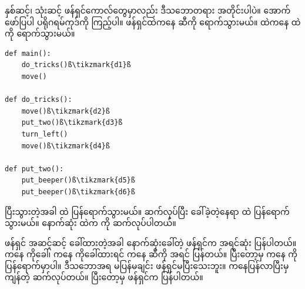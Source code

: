 နှစ်ဆင့်၊ သုံးဆင့် ဖန်ရှင်ကောလ်တွေမှာလည်း ဒီသဘောတရား အတိုင်းပါပဲ။ အောက်ဖော်ပြပါ ပရိုဂရမ်ကုဒ်ကို ကြည့်ပါ။  ဖန်ရှင်ထဲကနေ  ဆီကို ရောက်သွားမယ်။  ထဲကနေ  ထဲကို ရောက်သွားမယ်။ 
%
\setlength{\fboxsep}{0pt}
\begin{verbatim}
def main():
    do_tricks()ß\tikzmark{d1}ß
    move()

def do_tricks():
    move()ß\tikzmark{d2}ß
    put_two()ß\tikzmark{d3}ß
    turn_left()
    move()ß\tikzmark{d4}ß

def put_two():
    put_beeper()ß\tikzmark{d5}ß
    put_beeper()ß\tikzmark{d6}ß
\end{verbatim}
%
%

 ပြီးသွားတဲ့အခါ  ထဲ ပြန်ရောက်သွားမယ်။ \fEn{,}  ဆက်လုပ်ပြီး  ခေါ်ခဲ့တဲ့နေရာ  ထဲ ပြန်ရောက်သွားမယ်။ နောက်ဆုံး  ထဲက   ကို ဆက်လုပ်ပါတယ်။

ဖန်ရှင် အဆင့်ဆင့် ခေါ်ထားတဲ့အခါ နောက်ဆုံးခေါ်တဲ့ ဖန်ရှင်က အရင်ဆုံး  ပြန်ပါတယ်။  ကနေ  ကိုခေါ်၊  ကနေ  ကိုခေါ်ထားရင်  ကနေ  ဆီကို အရင်  ပြန်တယ်။ ပြီးတော့မှ  ကနေ  ကို ပြန်ရောက်မှာပါ။ ဒီသဘောအရ   မပြန်မချင်း  ဖန်ရှင်မပြီးသေးဘူး။  ကနေပြန်လာပြီးမှ ကျန်တဲ့ \fEn{,}  ဆက်လုပ်တယ်။ ပြီးတော့မှ  ဖန်ရှင်က  ပြန်ပါတယ်။ 


